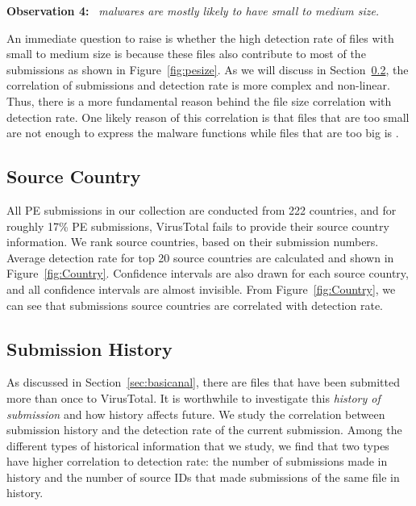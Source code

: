 {\bf Observation 4:} 
{\em \pe\ malwares are mostly likely to have small to medium size.}

An immediate question to raise is whether the high detection rate of files with small to medium size
is because these files also contribute to most of the submissions as shown in Figure~\ref{fig:pesize}.
As we will discuss in Section~\ref{sec:history}, the correlation of submissions and detection rate is more complex and non-linear.
Thus, there is a more fundamental reason behind the file size correlation with detection rate.
One likely reason of this correlation is that files that are too small are not enough to express the
malware functions while files that are too big is .

\subsection{Source Country}
\label{sec:country}

All PE submissions in our collection are conducted from 222 countries, 
and for roughly 17\% PE submissions, 
VirusTotal fails to provide their source country information. 
We rank source countries, based on their submission numbers. 
Average detection rate for top 20 source countries are calculated and shown in 
Figure~\ref{fig:Country}. 
Confidence intervals are also drawn for each source country, 
and all confidence intervals are almost invisible. 
From Figure~\ref{fig:Country}, 
we can see that submissions source countries are correlated with detection rate.

\fi


\subsection{Submission History}
\label{sec:history}

%



As discussed in Section~\ref{sec:basicanal}, there are files that have been submitted more than once to VirusTotal. 
It is worthwhile to investigate this {\em history of submission} and how history affects future.
We study the correlation between submission history and the detection rate of the current submission.
Among the different types of historical information that we study,
we find that two types have higher correlation to detection rate:
the number of submissions made in history and the number of source IDs that made submissions of the same file in history.

